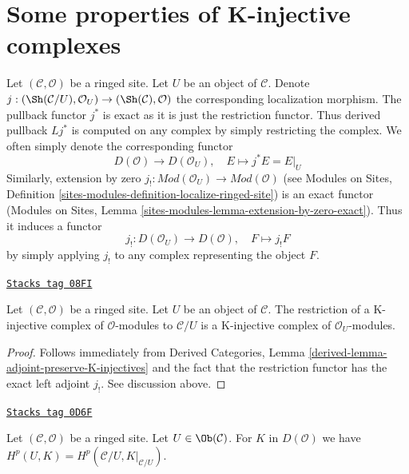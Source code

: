 \section{Some properties of K-injective complexes}
\label{sites-cohomology-section-properties-K-injective}
Let $(\mathcal{C}, \mathcal{O})$ be a ringed site. Let $U$ be an
object of $\mathcal{C}$. Denote
$j : (\Sh(\mathcal{C}/U), \mathcal{O}_U) \to (\Sh(\mathcal{C}), \mathcal{O})$
the corresponding localization morphism. The pullback functor $j^*$ is exact
as it is just the restriction functor. Thus derived pullback $Lj^*$ is
computed on any complex by simply restricting the complex. We often
simply denote the corresponding functor
$$
D(\mathcal{O}) \to D(\mathcal{O}_U),
\quad
E \mapsto j^*E = E|_U
$$
Similarly, extension by zero
$j_! : \textit{Mod}(\mathcal{O}_U) \to \textit{Mod}(\mathcal{O})$ (see
Modules on Sites, Definition
\ref{sites-modules-definition-localize-ringed-site})
is an exact functor
(Modules on Sites, Lemma \ref{sites-modules-lemma-extension-by-zero-exact}).
Thus it induces a functor
$$
j_! : D(\mathcal{O}_U) \to D(\mathcal{O}), \quad
F \mapsto j_!F
$$
by simply applying $j_!$ to any complex representing the object $F$.

\begin{lemma}
\label{sites-cohomology-lemma-restrict-K-injective-to-open}
\href{https://stacks.math.columbia.edu/tag/08FI}{\texttt{Stacks tag 08FI}}

Let $(\mathcal{C}, \mathcal{O})$ be a ringed site. Let $U$ be an object of
$\mathcal{C}$. The restriction of a K-injective complex of
$\mathcal{O}$-modules to $\mathcal{C}/U$ is a K-injective complex of
$\mathcal{O}_U$-modules.
\end{lemma}

\begin{proof}
Follows immediately from
Derived Categories, Lemma \ref{derived-lemma-adjoint-preserve-K-injectives}
and the fact that the restriction functor has the
exact left adjoint $j_!$. See discussion above.
\end{proof}

\begin{lemma}
\label{sites-cohomology-lemma-unbounded-cohomology-of-open}
\href{https://stacks.math.columbia.edu/tag/0D6F}{\texttt{Stacks tag 0D6F}}

Let $(\mathcal{C}, \mathcal{O})$ be a ringed site. Let $U \in \Ob(\mathcal{C})$.
For $K$ in $D(\mathcal{O})$ we have
$H^p(U, K) = H^p(\mathcal{C}/U, K|_{\mathcal{C}/U})$.
\end{lemma}

